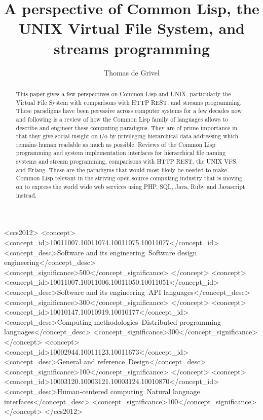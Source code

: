 \documentclass[sigconf]{acmart}
\begin{document}
\title{A perspective of Common Lisp, the UNIX Virtual File System, and
  streams programming}


\author{Thomas de Grivel}


\begin{abstract}
  This paper gives a few perspectives on Common Lisp and UNIX,
  particularly the Virtual File System with comparisons with HTTP
  REST, and streams programming. These paradigms have been pervasive
  across computer systems for a few decades now and following is a
  review of how the Common Lisp family of languages allows to describe
  and engineer these computing paradigms. They are of prime importance
  in that they give social insight on i/o by privileging hierarchical
  data addressing which remains human readable as much as
  possible. Reviews of the Common Lisp programming and system
  implementation interfaces for hierarchical file naming systems and
  stream programming, comparisons with HTTP REST, the UNIX VFS, and
  Erlang. These are the paradigms that would most likely be needed to
  make Common Lisp relevant in the striving open-source computing
  industry that is moving on to express the world wide web services
  using PHP, SQL, Java, Ruby and Javascript instead.
\end{abstract}


\begin{CCSXML}
  <ccs2012> <concept>
  <concept_id>10011007.10011074.10011075.10011077</concept_id>
  <concept_desc>Software and its engineering~Software design
  engineering</concept_desc>
  <concept_significance>500</concept_significance> </concept>
  <concept>
  <concept_id>10011007.10011006.10011050.10011051</concept_id>
  <concept_desc>Software and its engineering~API
  languages</concept_desc>
  <concept_significance>300</concept_significance> </concept>
  <concept> <concept_id>10010147.10010919.10010177</concept_id>
  <concept_desc>Computing methodologies~Distributed programming
  languages</concept_desc>
  <concept_significance>300</concept_significance> </concept>
  <concept> <concept_id>10002944.10011123.10011673</concept_id>
  <concept_desc>General and reference~Design</concept_desc>
  <concept_significance>100</concept_significance> </concept>
  <concept>
  <concept_id>10003120.10003121.10003124.10010870</concept_id>
  <concept_desc>Human-centered computing~Natural language
  interfaces</concept_desc>
  <concept_significance>100</concept_significance> </concept>
  </ccs2012>
\end{CCSXML}
\end{document}
